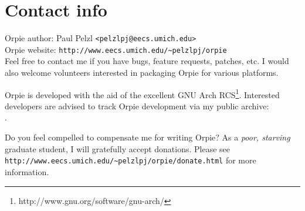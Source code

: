 \documentclass[11pt,notitlepage]{article}
\begin{document}
\section{Contact info}
Orpie author: Paul Pelzl {\tt <pelzlpj@eecs.umich.edu>} \\
Orpie website: {\tt http://www.eecs.umich.edu/\~{}pelzlpj/orpie} \\


\noindent
Feel free to contact me if you have bugs, feature requests, patches, etc.  I 
would also welcome volunteers interested in packaging Orpie for various platforms.

Orpie is developed with the aid of the excellent 
GNU Arch RCS\footnote{http://www.gnu.org/software/gnu-arch/}.
Interested developers are advised to track Orpie development via my public
archive: \\
 .  

Do you feel compelled to compensate me for writing Orpie?  As a {\em poor, 
starving} graduate student, I will gratefully accept 
donations.  Please see \\
{\tt http://www.eecs.umich.edu/\~{}pelzlpj/orpie/donate.html} for more information.
\end{document}
